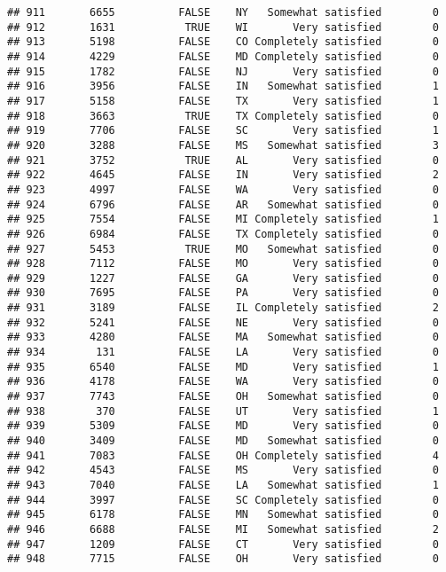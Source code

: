 \documentclass[]{book}
\theoremstyle{definition}
\theoremstyle{definition}
\theoremstyle{remark}
\begin{document}
\begin{verbatim}
## 911       6655          FALSE    NY   Somewhat satisfied        0
## 912       1631           TRUE    WI       Very satisfied        0
## 913       5198          FALSE    CO Completely satisfied        0
## 914       4229          FALSE    MD Completely satisfied        0
## 915       1782          FALSE    NJ       Very satisfied        0
## 916       3956          FALSE    IN   Somewhat satisfied        1
## 917       5158          FALSE    TX       Very satisfied        1
## 918       3663           TRUE    TX Completely satisfied        0
## 919       7706          FALSE    SC       Very satisfied        1
## 920       3288          FALSE    MS   Somewhat satisfied        3
## 921       3752           TRUE    AL       Very satisfied        0
## 922       4645          FALSE    IN       Very satisfied        2
## 923       4997          FALSE    WA       Very satisfied        0
## 924       6796          FALSE    AR   Somewhat satisfied        0
## 925       7554          FALSE    MI Completely satisfied        1
## 926       6984          FALSE    TX Completely satisfied        0
## 927       5453           TRUE    MO   Somewhat satisfied        0
## 928       7112          FALSE    MO       Very satisfied        0
## 929       1227          FALSE    GA       Very satisfied        0
## 930       7695          FALSE    PA       Very satisfied        0
## 931       3189          FALSE    IL Completely satisfied        2
## 932       5241          FALSE    NE       Very satisfied        0
## 933       4280          FALSE    MA   Somewhat satisfied        0
## 934        131          FALSE    LA       Very satisfied        0
## 935       6540          FALSE    MD       Very satisfied        1
## 936       4178          FALSE    WA       Very satisfied        0
## 937       7743          FALSE    OH   Somewhat satisfied        0
## 938        370          FALSE    UT       Very satisfied        1
## 939       5309          FALSE    MD       Very satisfied        0
## 940       3409          FALSE    MD   Somewhat satisfied        0
## 941       7083          FALSE    OH Completely satisfied        4
## 942       4543          FALSE    MS       Very satisfied        0
## 943       7040          FALSE    LA   Somewhat satisfied        1
## 944       3997          FALSE    SC Completely satisfied        0
## 945       6178          FALSE    MN   Somewhat satisfied        0
## 946       6688          FALSE    MI   Somewhat satisfied        2
## 947       1209          FALSE    CT       Very satisfied        0
## 948       7715          FALSE    OH       Very satisfied        0

\end{verbatim}
\end{document}
